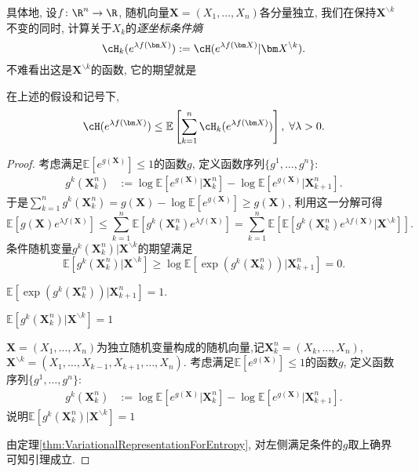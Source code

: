 具体地, 设$f \colon \R^n \to \R$, 随机向量$\bm X = (X_1, \dots, X_n)$各分量独立, 我们在保持$\bm X^{\backslash k}$不变的同时, 计算关于$X_k$的\emph{逐坐标条件熵}
\begin{equation*}
	\cH_k ( e^{\lambda f(\bm X)} )
	:= \cH ( e^{\lambda f(\bm X)} | \bm X^{\backslash k} ). 
\end{equation*}
不难看出这是$\bm X^{\backslash k}$的函数, 它的期望就是

\begin{lemma}[熵的张量化]\label{lemma:EntropyTensorization}
	在上述的假设和记号下, 
	\begin{equation*}
		\cH(e^{\lambda f(\bm X)})
		\leq \mathbb{E}\left[ \sum_{k=1}^n \cH_k (e^{\lambda f(\bm X)}) \right],\; 
		\forall \lambda > 0. 
	\end{equation*}
\end{lemma}
\begin{proof}
	考虑满足$\mathbb{E}[e^{g(\bm X)}] \leq 1$的函数$g$, 定义函数序列$\{g^1, \dots, g^n\}$: 
	\begin{align*}
		g^k(\bm X_k^n) &:= \log \mathbb{E}[e^{g(\bm X)} | \bm X_k^n] - \log \mathbb{E}[e^{g(\bm X)} | \bm X_{k+1}^n]. 
	\end{align*}
	于是$\sum_{k=1}^n g^k(\bm X_k^n) = g(\bm X) - \log \mathbb{E}[ e^{g(\bm X)} ] \geq g(\bm X)$, 利用这一分解可得
	\begin{equation*}
		\mathbb{E}[ g(\bm X) e^{\lambda f(\bm X)}]
		\leq \sum_{k=1}^n \mathbb{E}[ g^k(\bm X_k^n) e^{\lambda f(\bm X)} ] 
		= \sum_{k=1}^n \mathbb{E}\left[ \mathbb{E}[ g^k(\bm X_k^n) e^{\lambda f(\bm X)} | \bm X^{\backslash k} ] \right]. 
	\end{equation*}
	条件随机变量$g^k(\bm X_k^n)| \bm X^{\backslash k}$的期望满足
	\begin{equation*}
		\mathbb{E}\left[ g^k(\bm X_k^n) | \bm X^{\backslash k} \right]
		\geq \log \mathbb{E}\left[ \exp(g^k(\bm X_k^n)) |\bm X_{k+1}^n \right] = 0. 
	\end{equation*}
	
	$\mathbb{E}\left[ \exp(g^k(\bm X_k^n)) |\bm X_{k+1}^n \right] = 1$. 
	
	$\mathbb{E}\left[ g^k(\bm X_k^n) | \bm X^{\backslash k} \right] = 1$
	
	\sp 
	$\bm X = (X_1, \dots, X_n)$为独立随机变量构成的随机向量,记$\bm X_k^n = (X_k, \dots, X_n)$, $\bm X^{\backslash k} = (X_1, \dots, X_{k-1}, X_{k+1}, \dots, X_n)$. 
	考虑满足$\mathbb{E}[e^{g(\bm X)}] \leq 1$的函数$g$, 定义函数序列$\{g^1, \dots, g^n\}$: 
	\begin{align*}
		g^k(\bm X_k^n) &:= \log \mathbb{E}[e^{g(\bm X)} | \bm X_k^n] - \log \mathbb{E}[e^{g(\bm X)} | \bm X_{k+1}^n]. 
	\end{align*}
	说明$\mathbb{E}\left[ g^k(\bm X_k^n) | \bm X^{\backslash k} \right] =1$
	
	由定理\ref{thm:VariationalRepresentationForEntropy}, 对左侧满足条件的$g$取上确界可知引理成立. 
\end{proof}


